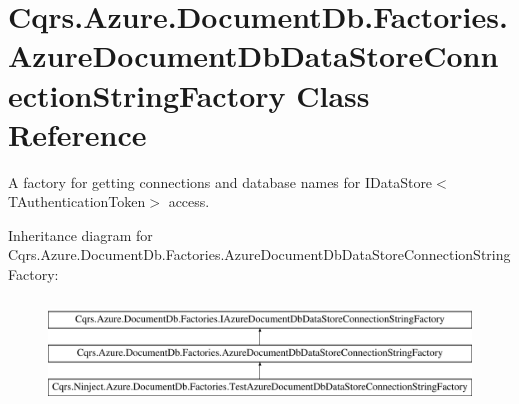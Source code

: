 \hypertarget{classCqrs_1_1Azure_1_1DocumentDb_1_1Factories_1_1AzureDocumentDbDataStoreConnectionStringFactory}{}\section{Cqrs.\+Azure.\+Document\+Db.\+Factories.\+Azure\+Document\+Db\+Data\+Store\+Connection\+String\+Factory Class Reference}
\label{classCqrs_1_1Azure_1_1DocumentDb_1_1Factories_1_1AzureDocumentDbDataStoreConnectionStringFactory}


A factory for getting connections and database names for I\+Data\+Store$<$\+T\+Authentication\+Token$>$ access.  


Inheritance diagram for Cqrs.\+Azure.\+Document\+Db.\+Factories.\+Azure\+Document\+Db\+Data\+Store\+Connection\+String\+Factory\+:\begin{figure}[H]
\begin{center}
\leavevmode
\includegraphics[height=2.847458cm]{classCqrs_1_1Azure_1_1DocumentDb_1_1Factories_1_1AzureDocumentDbDataStoreConnectionStringFactory}
\end{center}
\end{figure}
